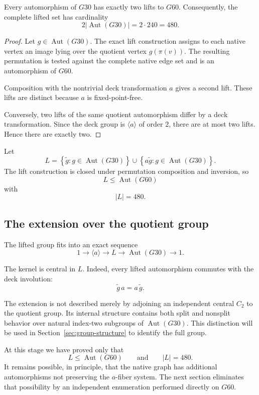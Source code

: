 \begin{theorem}
\label{thm:two-lifts}
Every automorphism of $G30$ has exactly two lifts to $G60$.
Consequently, the complete lifted set has cardinality
\[
2\left|\operatorname{Aut}(G30)\right|
=
2\cdot240
=
480.
\]
\end{theorem}

\begin{proof}
Let $g\in\operatorname{Aut}(G30)$. The exact lift construction assigns
to each native vertex an image lying over the quotient vertex
$g(\pi(v))$. The resulting permutation is tested against the complete
native edge set and is an automorphism of $G60$.

Composition with the nontrivial deck transformation $a$ gives a second
lift. These lifts are distinct because $a$ is fixed-point-free.

Conversely, two lifts of the same quotient automorphism differ by a deck
transformation. Since the deck group is $\langle a\rangle$ of order $2$,
there are at most two lifts. Hence there are exactly two.
\end{proof}

Let
\[
L
=
\left\{
\widetilde g:
g\in\operatorname{Aut}(G30)
\right\}
\cup
\left\{
a\widetilde g:
g\in\operatorname{Aut}(G30)
\right\}.
\]
The lift construction is closed under permutation composition and
inversion, so
\[
L\leq\operatorname{Aut}(G60)
\]
with
\[
|L|=480.
\]

\subsection{The extension over the quotient group}

The lifted group fits into an exact sequence
\[
1
\longrightarrow
\langle a\rangle
\longrightarrow
L
\longrightarrow
\operatorname{Aut}(G30)
\longrightarrow
1.
\]

The kernel is central in $L$. Indeed, every lifted automorphism commutes
with the deck involution:
\[
\widetilde g\,a=a\,\widetilde g.
\]

The extension is not described merely by adjoining an independent
central $C_2$ to the quotient group. Its internal structure contains
both split and nonsplit behavior over natural index-two subgroups of
$\operatorname{Aut}(G30)$. This distinction will be used in
Section~\ref{sec:group-structure} to identify the full group.

At this stage we have proved only that
\[
L\leq\operatorname{Aut}(G60)
\qquad\text{and}\qquad
|L|=480.
\]
It remains possible, in principle, that the native graph has additional
automorphisms not preserving the $a$-fiber system. The next section
eliminates that possibility by an independent enumeration performed
directly on $G60$.
